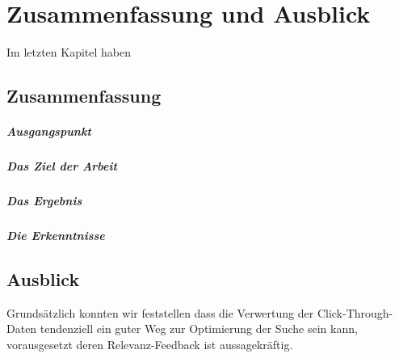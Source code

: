 %
\chapter{Zusammenfassung und Ausblick}
\label{sec:ZusammenfassungAusblick}

Im letzten Kapitel haben 

\section{Zusammenfassung}
\label{sec:ZusammenfassungAusblick:Zusammenfassung}

\paragraph{Ausgangspunkt}

\paragraph{Das Ziel der Arbeit}

\paragraph{Das Ergebnis}


\paragraph{Die Erkenntnisse}

\section{Ausblick}
\label{sec:ZusammenfassungAusblick:Ausblick}






Grundsätzlich konnten wir feststellen dass die Verwertung der Click-Through-Daten tendenziell ein guter Weg zur Optimierung der Suche sein kann, vorausgesetzt deren Relevanz-Feedback ist aussagekräftig. 